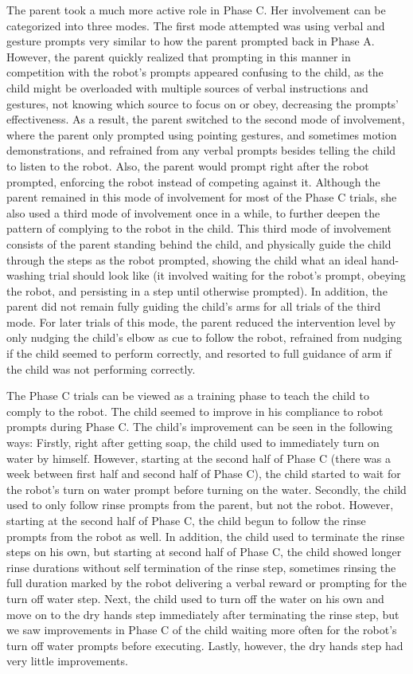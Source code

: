 The parent took a much more active role in Phase C.  Her involvement can be categorized into three modes.  The first mode attempted was using verbal and gesture prompts very similar to how the parent prompted back in Phase A.  However, the parent quickly realized that prompting in this manner in competition with the robot's prompts appeared confusing to the child, as the child might be overloaded with multiple sources of verbal instructions and gestures, not knowing which source to focus on or obey, decreasing the prompts' effectiveness.  As a result, the parent switched to the second mode of involvement, where the parent only prompted using pointing gestures, and sometimes motion demonstrations, and refrained from any verbal prompts besides telling the child to listen to the robot.  Also, the parent would prompt right after the robot prompted, enforcing the robot instead of competing against it.  Although the parent remained in this mode of involvement for most of the Phase C trials, she also used a third mode of involvement once in a while, to further deepen the pattern of complying to the robot in the child.  This third mode of involvement consists of the parent standing behind the child, and physically guide the child through the steps as the robot prompted, showing the child what an ideal hand-washing trial should look like (it involved waiting for the robot's prompt, obeying the robot, and persisting in a step until otherwise prompted).  In addition, the parent did not remain fully guiding the child's arms for all trials of the third mode.  For later trials of this mode, the parent reduced the intervention level by only nudging the child's elbow as cue to follow the robot, refrained from nudging if the child seemed to perform correctly, and resorted to full guidance of arm if the child was not performing correctly.

The Phase C trials can be viewed as a training phase to teach the child to comply to the robot.  The child seemed to improve in his compliance to robot prompts during Phase C.  The child's improvement can be seen in the following ways:  Firstly, right after getting soap, the child used to immediately turn on water by himself.  However, starting at the second half of Phase C (there was a week between first half and second half of Phase C), the child started to wait for the robot's turn on water prompt before turning on the water.  Secondly, the child used to only follow rinse prompts from the parent, but not the robot.  However, starting at the second half of Phase C, the child begun to follow the rinse prompts from the robot as well.  In addition, the child used to terminate the rinse steps on his own, but starting at second half of Phase C, the child showed longer rinse durations without self termination of the rinse step, sometimes rinsing the full duration marked by the robot delivering a verbal reward or prompting for the turn off water step.  Next, the child used to turn off the water on his own and move on to the dry hands step immediately after terminating the rinse step, but we saw improvements in Phase C of the child waiting more often for the robot's turn off water prompts before executing.  Lastly, however, the dry hands step had very little improvements.


